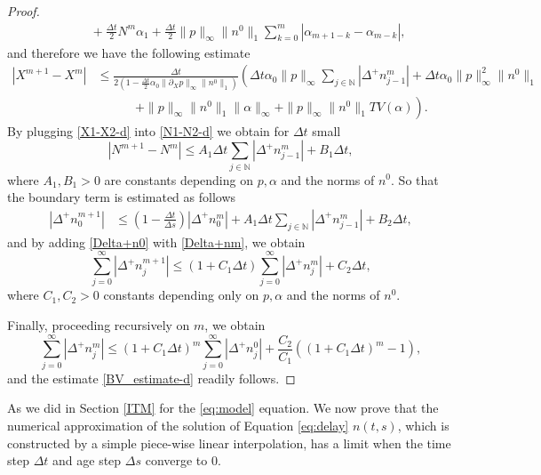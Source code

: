 \documentclass[11pt,a4paper]{article}
\newcommand{\N}{\mathbb{N}}
\begin{document}
\begin{proof}
\begin{equation*}
\begin{split}
       &\qquad +\frac{\Delta t}{2} N^m\alpha_1+\frac{\Delta t}{2}\|p\|_\infty\|n^0\|_1\sum_{k=0}^{m}|\alpha_{m+1-k}-\alpha_{m-k}|,
    \end{split}
\end{equation*}
and therefore we have the following estimate
\begin{equation}
\begin{split} \label{X1-X2-d}
     |X^{m+1}-X^m| &\le \frac{\Delta t}{2(1-\frac{\Delta t}{2}\alpha_0\|\partial_X p\|_\infty\|n^0\|_1)}\left(\Delta t\alpha_0\|p\|_\infty\sum_{j\in\N} |\Delta^+ n^m_{j-1}| +\Delta t\alpha_0\|p\|_\infty^2\|n^0\|_1 \right. \\
     &\left.\phantom{\sum_{j\in\N}}+
    \|p\|_\infty\|n^0\|_1\|\alpha\|_\infty+\|p\|_\infty\|n^0\|_1 TV(\alpha)\right).
\end{split}
\end{equation}
By plugging \eqref{X1-X2-d} into \eqref{N1-N2-d} we obtain for $\Delta t$ small
\begin{equation*}
|N^{m+1}-N^m|\le A_1\Delta t\sum_{j\in\N}|\Delta^+ n^m_{j-1}|+B_1\Delta t,
\end{equation*}
where $A_1,B_1>0$ are constants depending on $p,\alpha$ and the norms of $n^0$. So that the boundary term is estimated as follows
\begin{equation}
\label{Delta+n0}
\begin{split}
     |\Delta^{+}n_0^{m+1}|
     &\le \left(1-\frac{\Delta t}{\Delta s}\right)|\Delta^+ n_0^m|+  A_1\Delta t\sum_{j\in\N}|\Delta^+ n^m_{j-1}|+B_2\Delta t,
\end{split}
\end{equation}
and by adding \eqref{Delta+n0} with \eqref{Delta+nm}, we obtain
\begin{equation}
\sum_{j=0}^\infty|\Delta^{+}n_j^{m+1}|\le
(1+C_1\Delta t)\sum_{j=0}^\infty|\Delta^{+}n_j^{m}|+C_2\Delta t,
\end{equation}
where $C_1,C_2>0$ constants depending only on $p,\alpha$ and the norms of $n^0$.

Finally, proceeding recursively on $m$, we obtain
\begin{equation*}
 \sum_{j=0}^\infty|\Delta^{+}n_j^m|\le (1+C_1\Delta t)^{m}\sum_{j=0}^\infty|\Delta^{+}n_j^{0}|+\frac{C_2}{C_1}\left((1+C_1\Delta t)^{m}-1\right),
\end{equation*}
and the estimate \eqref{BV_estimate-d} readily follows.
\end{proof}


As we did in Section \ref{ITM} for the \eqref{eq:model} equation. We now prove that the numerical approximation of the solution of Equation \eqref{eq:delay} $n(t,s)$, which is constructed by a simple piece-wise linear interpolation, has a limit when the time step $\Delta t$ and age step $\Delta s$ converge to $0$. 
\end{document}
